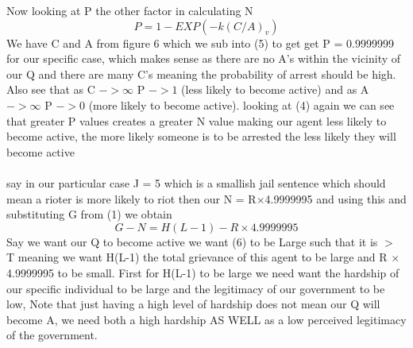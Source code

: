 \documentclass[11pt]{article}
\begin{document}
	Now looking at P the other factor in calculating N
	\begin{equation}
		P = 1 - EXP(-k(C/A)_{v})
	\end{equation}
	We have C and A from figure 6 which we sub into (5) to get get P = 0.9999999 for our specific case, which makes sense as there are no A's within the vicinity of our Q and there are many C's meaning the probability of arrest should be high. Also see that as C $-> \infty$ P $-> 1$ (less likely to become active) and as A $-> \infty$ P $-> 0$ (more likely to become active). looking at (4) again we can see that greater P values creates a greater N value making our agent less likely to become active, the more likely someone is to be arrested the less likely they will become active\\
	\\
	say in our particular case J = 5 which is a smallish jail sentence which should mean a rioter is more likely to riot then our N = R$\times$4.9999995 and using this and substituting G from (1) we obtain
	\begin{equation}
		G-N = H(L-1)-R \times 4.9999995
	\end{equation}
	Say we want our Q to become active we want (6) to be Large such that it is $>$ T meaning we want H(L-1) the total grievance of this agent to be large and R $\times$ 4.9999995 to be small. First for H(L-1) to be large we need want the hardship of our specific individual to be large and the legitimacy of our government to be low, Note that just having a high level of hardship does not mean our Q will become A, we need both a high hardship AS WELL as a low perceived legitimacy of the government.\\
	\\
\end{document}
